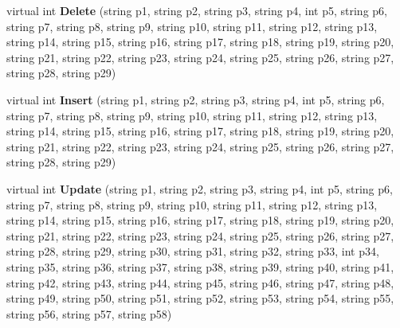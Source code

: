 \begin{DoxyCompactItemize}
\item 
virtual int {\bfseries Delete} (string p1, string p2, string p3, string p4, int p5, string p6, string p7, string p8, string p9, string p10, string p11, string p12, string p13, string p14, string p15, string p16, string p17, string p18, string p19, string p20, string p21, string p22, string p23, string p24, string p25, string p26, string p27, string p28, string p29)\hypertarget{class_products_1_1_data_1_1ds_sage_table_adapters_1_1ta_kontakt_email_a03ebfb9dfe86989924c42ceb498d03a6}{}\label{class_products_1_1_data_1_1ds_sage_table_adapters_1_1ta_kontakt_email_a03ebfb9dfe86989924c42ceb498d03a6}

\item 
virtual int {\bfseries Insert} (string p1, string p2, string p3, string p4, int p5, string p6, string p7, string p8, string p9, string p10, string p11, string p12, string p13, string p14, string p15, string p16, string p17, string p18, string p19, string p20, string p21, string p22, string p23, string p24, string p25, string p26, string p27, string p28, string p29)\hypertarget{class_products_1_1_data_1_1ds_sage_table_adapters_1_1ta_kontakt_email_a8d8514dda6cbc3924f97e4d45359acd4}{}\label{class_products_1_1_data_1_1ds_sage_table_adapters_1_1ta_kontakt_email_a8d8514dda6cbc3924f97e4d45359acd4}

\item 
virtual int {\bfseries Update} (string p1, string p2, string p3, string p4, int p5, string p6, string p7, string p8, string p9, string p10, string p11, string p12, string p13, string p14, string p15, string p16, string p17, string p18, string p19, string p20, string p21, string p22, string p23, string p24, string p25, string p26, string p27, string p28, string p29, string p30, string p31, string p32, string p33, int p34, string p35, string p36, string p37, string p38, string p39, string p40, string p41, string p42, string p43, string p44, string p45, string p46, string p47, string p48, string p49, string p50, string p51, string p52, string p53, string p54, string p55, string p56, string p57, string p58)\hypertarget{class_products_1_1_data_1_1ds_sage_table_adapters_1_1ta_kontakt_email_a8d959672c0da27acdea6e6ddc575333f}{}\label{class_products_1_1_data_1_1ds_sage_table_adapters_1_1ta_kontakt_email_a8d959672c0da27acdea6e6ddc575333f}


\end{DoxyCompactItemize}

